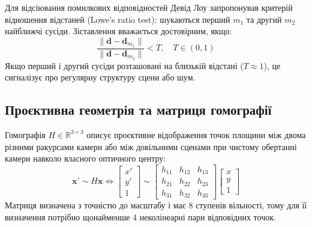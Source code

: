 \documentclass[14pt, a4paper]{article}
\begin{document}
Для відсіювання помилкових відповідностей Девід Лоу запропонував критерій відношення відстаней (Lowe's ratio test): шукаються перший $m_1$ та другий $m_2$ найближчі сусіди. Зіставлення вважається достовірним, якщо:
\begin{equation}
    \frac{\|\mathbf{d} - \mathbf{d}_{m_1}\|}{\|\mathbf{d} - \mathbf{d}_{m_2}\|} < T, \quad T \in (0, 1)
\end{equation}
Якщо перший і другий сусіди розташовані на близькій відстані ($T \approx 1$), це сигналізує про регулярну структуру сцени або шум.

\subsection{Проєктивна геометрія та матриця гомографії}
Гомографія $H \in \mathbb{R}^{3 \times 3}$ описує проєктивне відображення точок площини між двома різними ракурсами камери або між довільними сценами при чистому обертанні камери навколо власного оптичного центру:
\begin{equation}
    \mathbf{x}' \sim H \mathbf{x} \iff \begin{bmatrix} x' \\ y' \\ 1 \end{bmatrix} \sim \begin{bmatrix} h_{11} & h_{12} & h_{13} \\ h_{21} & h_{22} & h_{23} \\ h_{31} & h_{32} & h_{33} \end{bmatrix} \begin{bmatrix} x \\ y \\ 1 \end{bmatrix}
\end{equation}
Матриця визначена з точністю до масштабу і має 8 ступенів вільності, тому для її визначення потрібно щонайменше 4 неколінеарні пари відповідних точок.
\end{document}
